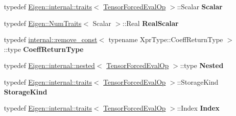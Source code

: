 \begin{DoxyCompactItemize}
\item 
\mbox{\label{class_eigen_1_1_tensor_forced_eval_op_ae8d2d94bec0a022ae7f4f1a9dfe626f4}} 
typedef \hyperlink{struct_eigen_1_1internal_1_1traits}{Eigen\+::internal\+::traits}$<$ \hyperlink{class_eigen_1_1_tensor_forced_eval_op}{Tensor\+Forced\+Eval\+Op} $>$\+::Scalar {\bfseries Scalar}
\item 
\mbox{\label{class_eigen_1_1_tensor_forced_eval_op_a350fe842a9813d17781293b963988136}} 
typedef \hyperlink{group___core___module_struct_eigen_1_1_num_traits}{Eigen\+::\+Num\+Traits}$<$ Scalar $>$\+::Real {\bfseries Real\+Scalar}
\item 
\mbox{\label{class_eigen_1_1_tensor_forced_eval_op_ab32b567d11d49e5710a7e657d6b7f591}} 
typedef \hyperlink{struct_eigen_1_1internal_1_1remove__const}{internal\+::remove\+\_\+const}$<$ typename Xpr\+Type\+::\+Coeff\+Return\+Type $>$\+::type {\bfseries Coeff\+Return\+Type}
\item 
\mbox{\label{class_eigen_1_1_tensor_forced_eval_op_a64370cdbb2a5d1be7da13ea60616a686}} 
typedef \hyperlink{struct_eigen_1_1internal_1_1nested}{Eigen\+::internal\+::nested}$<$ \hyperlink{class_eigen_1_1_tensor_forced_eval_op}{Tensor\+Forced\+Eval\+Op} $>$\+::type {\bfseries Nested}
\item 
\mbox{\label{class_eigen_1_1_tensor_forced_eval_op_a865527882c154e051cf69b98d1ae7339}} 
typedef \hyperlink{struct_eigen_1_1internal_1_1traits}{Eigen\+::internal\+::traits}$<$ \hyperlink{class_eigen_1_1_tensor_forced_eval_op}{Tensor\+Forced\+Eval\+Op} $>$\+::Storage\+Kind {\bfseries Storage\+Kind}
\item 
\mbox{\label{class_eigen_1_1_tensor_forced_eval_op_a0410ea106b6a36ca7304cd0e20daf9fa}} 
typedef \hyperlink{struct_eigen_1_1internal_1_1traits}{Eigen\+::internal\+::traits}$<$ \hyperlink{class_eigen_1_1_tensor_forced_eval_op}{Tensor\+Forced\+Eval\+Op} $>$\+::Index {\bfseries Index}
\end{DoxyCompactItemize}
